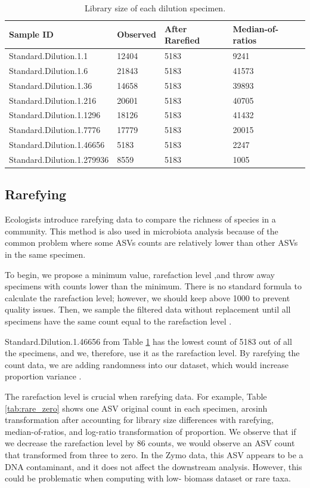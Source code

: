 \documentclass[12pt]{article}
\begin{document}
\begin{table}[ht]
\caption{Library size of each dilution specimen.}
\centering
\begin{tabular}{l|l|l|l}
  \hline
 Sample ID & Observed & After Rarefied & Median-of-ratios \\ 
  \hline
  Standard.Dilution.1.1 & 12404 & 5183 & 9241\\ 
  Standard.Dilution.1.6 & 21843& 5183 & 41573 \\ 
  Standard.Dilution.1.36 & 14658 & 5183 & 39893 \\ 
  Standard.Dilution.1.216 & 20601 & 5183 & 40705 \\ 
  Standard.Dilution.1.1296 & 18126 & 5183 & 41432 \\ 
  Standard.Dilution.1.7776 & 17779 & 5183 & 20015 \\ 
  Standard.Dilution.1.46656 & 5183 & 5183& 2247\\ 
  Standard.Dilution.1.279936 & 8559& 5183 & 1005 \\ 
   \hline
\end{tabular}
\label{tab:count}
\end{table}

\subsection{Rarefying}

Ecologists introduce rarefying data to compare the richness of species in a community. This method is also used in microbiota analysis because of the common problem where some ASVs counts are relatively lower than other ASVs in the same specimen.

To begin, we propose a minimum value, rarefaction level ,and throw away specimens with counts lower than the minimum. There is no standard formula to calculate the rarefaction level; however, we should keep above 1000 to prevent quality issues. Then, we sample the filtered data without replacement until all specimens have the same count equal to the rarefaction level \citep{navas2013advancing}.

Standard.Dilution.1.46656 from Table \ref{tab:count} has the lowest count of 5183 out of all the specimens, and we, therefore, use it as the rarefaction level. By rarefying the count data, we are adding randomness into our dataset, which would increase proportion variance \citep{mcmurdie2014waste}.

The rarefaction level is crucial when rarefying data. For example, Table \ref{tab:rare_zero} shows one ASV original count in each specimen, arcsinh transformation after accounting for library size differences with rarefying, median-of-ratios, and log-ratio transformation of proportion. We observe that if we decrease the rarefaction level by 86 counts, we would observe an ASV count that transformed from three to zero. In the Zymo data, this ASV appears to be a DNA contaminant, and it does not affect the downstream analysis. However, this could be problematic when computing with low- biomass dataset or rare taxa. 
\end{document}
